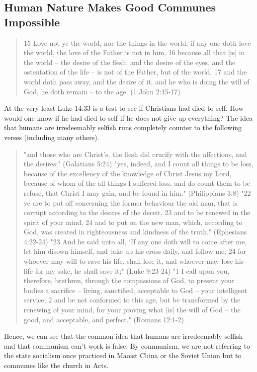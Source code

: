 \documentclass[11pt]{article}
\begin{document}
\subsection{Human Nature Makes Good Communes Impossible}
\begin{quote}
15 Love not ye the world, nor the things in the world; if any one doth love the world, the love of the Father is not in him,
16 because all that [is] in the world -- the desire of the flesh, and the desire of the eyes, and the ostentation of the life -- is not of the Father, but of the world, 17 and the world doth pass away, and the desire of it, and he who is doing the will of God, he doth remain -- to the age. (1 John 2:15-17)
\end{quote}
 At the very least Luke 14:33 is a test to see if Christians had died to self. How would one know if he had died to self if he does not give up everything? The idea that humans are irredeemably selfish runs completely counter to the following verses (including many others).\cite{death to self verses}
\begin{quote}
 "and those who are Christ's, the flesh did crucify with the affections, and the desires;" (Galatians 5:24) \newline
"yes, indeed, and I count all things to be loss, because of the excellency of the knowledge of Christ Jesus my Lord, because of whom of the all things I suffered loss, and do count them to be refuse, that Christ I may gain, and be found in him," (Philippians 3:8)\newline
 "22 ye are to put off concerning the former behaviour the old man, that is corrupt according to the desires of the deceit, 23 and to be renewed in the spirit of your mind, 24 and to put on the new man, which, according to God, was created in righteousness and kindness of the truth." (Ephesians 4:22-24)  \newline
 "23 And he said unto all, `If any one doth will to come after me, let him disown himself, and take up his cross daily, and follow me; 24 for whoever may will to save his life, shall lose it, and whoever may lose his life for my sake, he shall save it;" (Luke 9:23-24) \newline
"1 I call upon you, therefore, brethren, through the compassions of God, to present your bodies a sacrifice -- living, sanctified, acceptable to God -- your intelligent service; 2 and be not conformed to this age, but be transformed by the renewing of your mind, for your proving what [is] the will of God -- the good, and acceptable, and perfect." (Romans 12:1-2)\newline
 \end{quote} 
Hence, we can see that the common idea that humans are irredeemably selfish and that communism can't work is false. By communism, we are not referring to the state socialism once practiced in Maoist China or the Soviet Union but to communes like the church in Acts.
\end{document}
